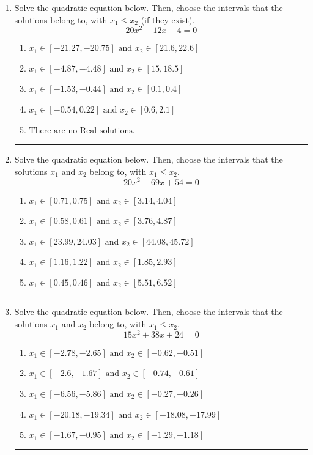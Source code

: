 \documentclass[14pt]{extbook}
\newcommand{\litem}[1]{\item#1\hspace*{-1cm}\rule{\textwidth}{0.4pt}}
\begin{document}
\begin{enumerate}
{\begin{enumerate}[label=\Alph*.]
\end{enumerate} }
\litem{
Solve the quadratic equation below. Then, choose the intervals that the solutions belong to, with $x_1 \leq x_2$ (if they exist).\[ 20x^{2} -12 x -4 = 0 \]\begin{enumerate}[label=\Alph*.]
\item \( x_1 \in [-21.27, -20.75] \text{ and } x_2 \in [21.6, 22.6] \)
\item \( x_1 \in [-4.87, -4.48] \text{ and } x_2 \in [15, 18.5] \)
\item \( x_1 \in [-1.53, -0.44] \text{ and } x_2 \in [0.1, 0.4] \)
\item \( x_1 \in [-0.54, 0.22] \text{ and } x_2 \in [0.6, 2.1] \)
\item \( \text{There are no Real solutions.} \)

\end{enumerate} }
\litem{
Solve the quadratic equation below. Then, choose the intervals that the solutions $x_1$ and $x_2$ belong to, with $x_1 \leq x_2$.\[ 20x^{2} -69 x + 54 = 0 \]\begin{enumerate}[label=\Alph*.]
\item \( x_1 \in [0.71, 0.75] \text{ and } x_2 \in [3.14, 4.04] \)
\item \( x_1 \in [0.58, 0.61] \text{ and } x_2 \in [3.76, 4.87] \)
\item \( x_1 \in [23.99, 24.03] \text{ and } x_2 \in [44.08, 45.72] \)
\item \( x_1 \in [1.16, 1.22] \text{ and } x_2 \in [1.85, 2.93] \)
\item \( x_1 \in [0.45, 0.46] \text{ and } x_2 \in [5.51, 6.52] \)

\end{enumerate} }
\litem{
Solve the quadratic equation below. Then, choose the intervals that the solutions $x_1$ and $x_2$ belong to, with $x_1 \leq x_2$.\[ 15x^{2} +38 x + 24 = 0 \]\begin{enumerate}[label=\Alph*.]
\item \( x_1 \in [-2.78, -2.65] \text{ and } x_2 \in [-0.62, -0.51] \)
\item \( x_1 \in [-2.6, -1.67] \text{ and } x_2 \in [-0.74, -0.61] \)
\item \( x_1 \in [-6.56, -5.86] \text{ and } x_2 \in [-0.27, -0.26] \)
\item \( x_1 \in [-20.18, -19.34] \text{ and } x_2 \in [-18.08, -17.99] \)
\item \( x_1 \in [-1.67, -0.95] \text{ and } x_2 \in [-1.29, -1.18] \)


\end{enumerate}}
\end{enumerate}
\end{document}
